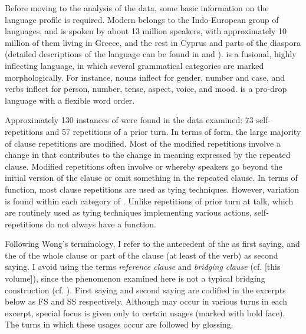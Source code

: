 \documentclass[output=paper]{LSP/langsci}
\begin{document}
Before moving to the analysis of the data, some basic information on the language profile is required. Modern  belongs to the Indo-European group of languages, and is spoken by about 13 million speakers, with approximately 10 million of them living in Greece, and the rest in Cyprus and parts of the  diaspora (detailed descriptions of the language can be found in \citealt{joseph87} and \citealt{Mackridge85}).  is a fusional, highly inflecting language, in which several grammatical categories are marked morphologically. For instance, nouns inflect for gender, number and case, and verbs inflect for person, number, tense, aspect, voice, and mood.  is a pro-drop language with a flexible word order.

Approximately 130 instances of  were found in the data examined: 73 self-repetitions and 57 repetitions of a prior turn. In terms of form, the large majority of clause repetitions are modified. Most of the modified repetitions involve a change in  that contributes to the change in meaning expressed by the repeated clause. Modified repetitions often involve  or  whereby speakers go beyond the initial version of the clause or omit something in the repeated clause. In terms of function, most clause repetitions are used as tying techniques. However, variation is found within each category of . Unlike repetitions of prior turn at talk, which are routinely used as tying techniques implementing various actions, self-repetitions do not always have a  function. 

Following Wong’s \citeyear{wong10} terminology, I refer to the antecedent of the  as first saying, and the  of the whole clause or part of the clause (at least of the verb) as second saying. I avoid using the terms \textit{reference clause} and \textit{bridging clause} (cf. \citealt{chapters/01Guerin-Aiton} [this volume]), since the phenomenon examined here is not a typical bridging construction (cf. ). First saying and second saying are codified in the excerpts below as FS and SS respectively. Although  may occur in various turns in each excerpt, special focus is given only to certain usages (marked with bold face). The turns in which these usages occur are followed by glossing. 
\end{document}
